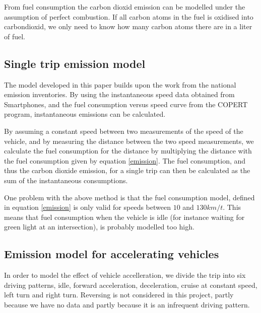 From fuel consumption the carbon dioxid emission can be modelled under the assumption of perfect combustion. If all carbon atoms in the fuel is oxidised into carbondioxid, we only need to know how many carbon atoms there are in a liter of fuel.

\subsection{Single trip emission model}
The model developed in this paper builds upon the work from the national emission inventories. By using the instantaneous speed data obtained from Smartphones, and the fuel consumption versus speed curve from the COPERT program, instantaneous emissions can be calculated.

By assuming a constant speed between two measurements of the speed of the vehicle, and by measuring the distance between the two speed measurements, we calculate the fuel consumption for the distance by multiplying the distance with the fuel consumption given by equation \ref{emission}. The fuel consumption, and thus the carbon dioxide emission, for a single trip can then be calculated as the sum of the instantaneous consumptions.

One problem with the above method is that the fuel consumption model, defined in equation \ref{emission} is only valid for speeds between $10$ and $130 km/t$. This means that fuel consumption when the vehicle is idle (for instance waiting for green light at an intersection), is probably modelled too high.


\subsection{Emission model for accelerating vehicles}

In order to model the effect of vehicle accelleration, we divide the trip into six driving patterns, idle, forward acceleration, deceleration, cruise at constant speed, left turn and right turn. Reversing is not considered in this project, partly because we have no data and partly because it is an infrequent driving pattern. 


 